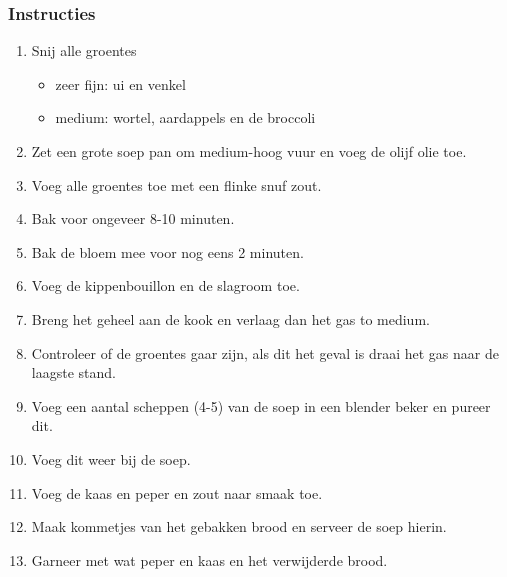 \subsubsection*{Instructies}
\begin{enumerate}
    \item Snij alle groentes
    \begin{itemize}
        \item zeer fijn: ui en venkel
        \item medium: wortel, aardappels en de broccoli
    \end{itemize}
    \item Zet een grote soep pan om medium-hoog vuur en voeg de olijf olie toe.
    \item Voeg alle groentes toe met een flinke snuf zout.
    \item Bak voor ongeveer 8-10 minuten.
    \item Bak de bloem mee voor nog eens 2 minuten.
    \item Voeg de kippenbouillon en de slagroom toe.
    \item Breng het geheel aan de kook en verlaag dan het gas to medium.
    \item Controleer of de groentes gaar zijn, als dit het geval is draai het gas naar de laagste stand.
    \item Voeg een aantal scheppen (4-5) van de soep in een blender beker en pureer dit.
    \item Voeg dit weer bij de soep.
    \item Voeg de kaas en peper en zout naar smaak toe.
    \item Maak kommetjes van het gebakken brood en serveer de soep hierin.
    \item Garneer met wat peper en kaas en het verwijderde brood.
\end{enumerate}